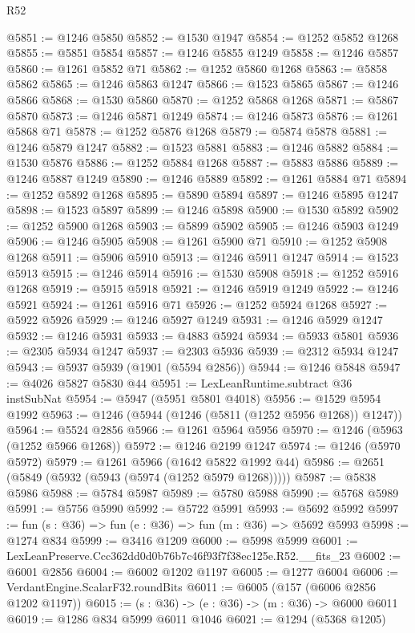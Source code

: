 \begin{lexlean}{R52}
\begin{coremodule}
@5851 := @1246 @5850
@5852 := @1530 @1947
@5854 := @1252 @5852 @1268
@5855 := @5851 @5854
@5857 := @1246 @5855 @1249
@5858 := @1246 @5857
@5860 := @1261 @5852 @71
@5862 := @1252 @5860 @1268
@5863 := @5858 @5862
@5865 := @1246 @5863 @1247
@5866 := @1523 @5865
@5867 := @1246 @5866
@5868 := @1530 @5860
@5870 := @1252 @5868 @1268
@5871 := @5867 @5870
@5873 := @1246 @5871 @1249
@5874 := @1246 @5873
@5876 := @1261 @5868 @71
@5878 := @1252 @5876 @1268
@5879 := @5874 @5878
@5881 := @1246 @5879 @1247
@5882 := @1523 @5881
@5883 := @1246 @5882
@5884 := @1530 @5876
@5886 := @1252 @5884 @1268
@5887 := @5883 @5886
@5889 := @1246 @5887 @1249
@5890 := @1246 @5889
@5892 := @1261 @5884 @71
@5894 := @1252 @5892 @1268
@5895 := @5890 @5894
@5897 := @1246 @5895 @1247
@5898 := @1523 @5897
@5899 := @1246 @5898
@5900 := @1530 @5892
@5902 := @1252 @5900 @1268
@5903 := @5899 @5902
@5905 := @1246 @5903 @1249
@5906 := @1246 @5905
@5908 := @1261 @5900 @71
@5910 := @1252 @5908 @1268
@5911 := @5906 @5910
@5913 := @1246 @5911 @1247
@5914 := @1523 @5913
@5915 := @1246 @5914
@5916 := @1530 @5908
@5918 := @1252 @5916 @1268
@5919 := @5915 @5918
@5921 := @1246 @5919 @1249
@5922 := @1246 @5921
@5924 := @1261 @5916 @71
@5926 := @1252 @5924 @1268
@5927 := @5922 @5926
@5929 := @1246 @5927 @1249
@5931 := @1246 @5929 @1247
@5932 := @1246 @5931
@5933 := @4883 @5924
@5934 := @5933 @5801
@5936 := @2305 @5934 @1247
@5937 := @2303 @5936
@5939 := @2312 @5934 @1247
@5943 := @5937 @5939 (@1901 (@5594 @2856))
@5944 := @1246 @5848
@5947 := @4026 @5827 @5830 @44
@5951 := LexLeanRuntime.subtract @36 instSubNat
@5954 := @5947 (@5951 @5801 @4018)
@5956 := @1529 @5954 @1992
@5963 := @1246 (@5944 (@1246 (@5811 (@1252 @5956 @1268)) @1247))
@5964 := @5524 @2856
@5966 := @1261 @5964 @5956
@5970 := @1246 (@5963 (@1252 @5966 @1268))
@5972 := @1246 @2199 @1247
@5974 := @1246 (@5970 @5972)
@5979 := @1261 @5966 (@1642 @5822 @1992 @44)
@5986 := @2651 (@5849 (@5932 (@5943 (@5974 (@1252 @5979 @1268)))))
@5987 := @5838 @5986
@5988 := @5784 @5987
@5989 := @5780 @5988
@5990 := @5768 @5989
@5991 := @5756 @5990
@5992 := @5722 @5991
@5993 := @5692 @5992
@5997 := fun (s : @36) => fun (e : @36) => fun (m : @36) => @5692 @5993
@5998 := @1274 @834
@5999 := @3416 @1209
@6000 := @5998 @5999
@6001 := LexLeanPreserve.Ccc362dd0d0b76b7c46f93f7f38ec125e.R52.__fits_23
@6002 := @6001 @2856
@6004 := @6002 @1202 @1197
@6005 := @1277 @6004
@6006 := VerdantEngine.ScalarF32.roundBits
@6011 := @6005 (@157 (@6006 @2856 @1202 @1197))
@6015 := (s : @36) -> (e : @36) -> (m : @36) -> @6000 @6011
@6019 := @1286 @834 @5999 @6011 @1046
@6021 := @1294 (@5368 @1205)

\end{coremodule}
\end{lexlean}
